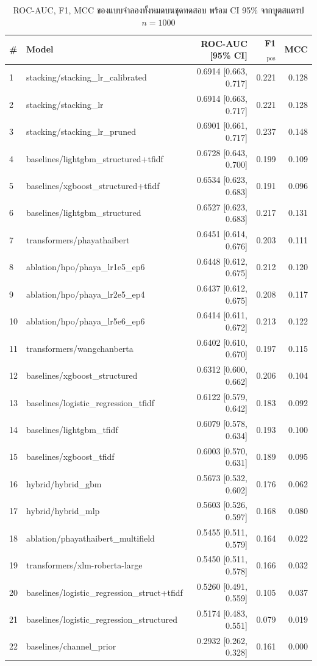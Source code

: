 \begin{table}[H]
\centering
\caption{ROC-AUC, F1, MCC ของแบบจำลองทั้งหมดบนชุดทดสอบ พร้อม CI 95\%
จากบูตสแตรป $n=1000$}
\label{tab:leaderboard}
\small
\begin{tabularx}{\textwidth}{lXrrr}
\toprule
\# & \textbf{Model} & \textbf{ROC-AUC [95\% CI]} & \textbf{F1$_{\text{pos}}$} & \textbf{MCC} \\
\midrule
1 & stacking/stacking\_lr\_calibrated & 0.6914 [0.663, 0.717] & 0.221 & 0.128 \\
2 & stacking/stacking\_lr            & 0.6914 [0.663, 0.717] & 0.221 & 0.128 \\
3 & stacking/stacking\_lr\_pruned    & 0.6901 [0.661, 0.717] & 0.237 & 0.148 \\
4 & baselines/lightgbm\_structured+tfidf & 0.6728 [0.643, 0.700] & 0.199 & 0.109 \\
5 & baselines/xgboost\_structured+tfidf  & 0.6534 [0.623, 0.683] & 0.191 & 0.096 \\
6 & baselines/lightgbm\_structured       & 0.6527 [0.623, 0.683] & 0.217 & 0.131 \\
7 & transformers/phayathaibert           & 0.6451 [0.614, 0.676] & 0.203 & 0.111 \\
8 & ablation/hpo/phaya\_lr1e5\_ep6        & 0.6448 [0.612, 0.675] & 0.212 & 0.120 \\
9 & ablation/hpo/phaya\_lr2e5\_ep4        & 0.6437 [0.612, 0.675] & 0.208 & 0.117 \\
10 & ablation/hpo/phaya\_lr5e6\_ep6        & 0.6414 [0.611, 0.672] & 0.213 & 0.122 \\
11 & transformers/wangchanberta           & 0.6402 [0.610, 0.670] & 0.197 & 0.115 \\
12 & baselines/xgboost\_structured         & 0.6312 [0.600, 0.662] & 0.206 & 0.104 \\
13 & baselines/logistic\_regression\_tfidf  & 0.6122 [0.579, 0.642] & 0.183 & 0.092 \\
14 & baselines/lightgbm\_tfidf              & 0.6079 [0.578, 0.634] & 0.193 & 0.100 \\
15 & baselines/xgboost\_tfidf               & 0.6003 [0.570, 0.631] & 0.189 & 0.095 \\
16 & hybrid/hybrid\_gbm                     & 0.5673 [0.532, 0.602] & 0.176 & 0.062 \\
17 & hybrid/hybrid\_mlp                     & 0.5603 [0.526, 0.597] & 0.168 & 0.080 \\
18 & ablation/phayathaibert\_multifield     & 0.5455 [0.511, 0.579] & 0.164 & 0.022 \\
19 & transformers/xlm-roberta-large         & 0.5450 [0.511, 0.578] & 0.166 & 0.032 \\
20 & baselines/logistic\_regression\_struct+tfidf & 0.5260 [0.491, 0.559] & 0.105 & 0.037 \\
21 & baselines/logistic\_regression\_structured  & 0.5174 [0.483, 0.551] & 0.079 & 0.019 \\
22 & baselines/channel\_prior                & 0.2932 [0.262, 0.328] & 0.161 & 0.000 \\
\bottomrule
\end{tabularx}
\end{table}

